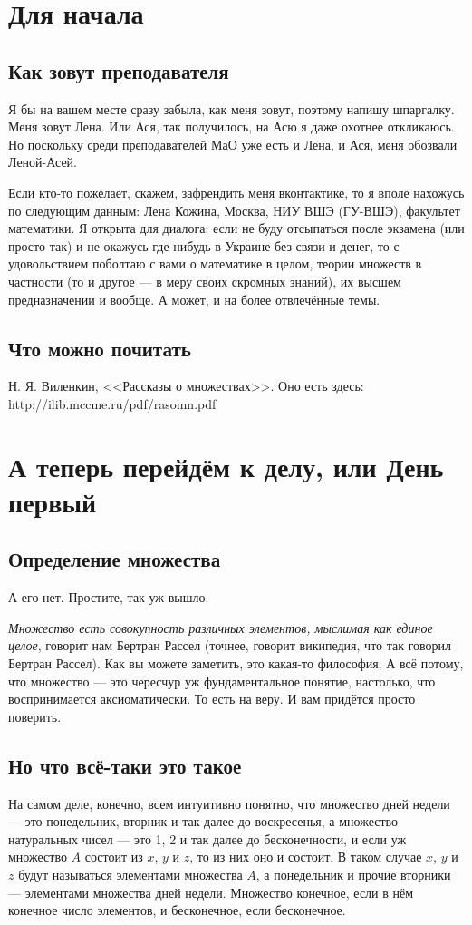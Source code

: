 \documentclass[12pt, onecolumn]{report}
\begin{document}
\chapter*{Для начала}
\section{Как зовут преподавателя}
Я бы на вашем месте сразу забыла, как меня зовут, поэтому напишу шпаргалку. Меня зовут Лена. Или Ася, так получилось, на Асю я даже охотнее откликаюсь. Но поскольку среди преподавателей МаО уже есть и Лена, и Ася, меня обозвали Леной-Асей.

Если кто-то пожелает, скажем, зафрендить меня вконтактике, то я вполе нахожусь по следующим данным: Лена Кожина, Москва, НИУ ВШЭ (ГУ-ВШЭ), факультет математики. Я открыта для диалога: если не буду отсыпаться после экзамена (или просто так) и не окажусь где-нибудь в Украине без связи и денег, то с удовольствием поболтаю с вами о математике в целом, теории множеств в частности (то и другое --- в меру своих скромных знаний), их высшем предназначении и вообще. А может, и на более отвлечённые темы. 
\section{Что можно почитать}
Н. Я. Виленкин, <<Рассказы о множествах>>. Оно есть здесь: \\ http://ilib.mccme.ru/pdf/rasomn.pdf
\chapter{А теперь перейдём к делу, или День первый}
\section{Определение множества}
А его нет. Простите, так уж вышло.

{\itshape Множество есть совокупность различных элементов, мыслимая как единое целое}, говорит нам Бертран Рассел  (точнее, говорит википедия, что так говорил Бертран Рассел). Как вы можете заметить, это какая-то философия. А всё потому, что множество --- это чересчур уж фундаментальное понятие, настолько, что воспринимается аксиоматически. То есть на веру. И вам придётся просто поверить.

\section{Но что всё-таки это такое}
На самом деле, конечно, всем интуитивно понятно, что множество дней недели --- это понедельник, вторник и так далее до воскресенья, а множество натуральных чисел --- это 1, 2 и так далее до бесконечности, и если уж множество $A$ состоит из $x$, $y$ и $z$, то из них оно и состоит. В таком случае $x$, $y$ и $z$ будут называться элементами множества $A$, а понедельник и прочие вторники --- элементами множества дней недели. Множество конечное, если в нём конечное число элементов, и бесконечное, если бесконечное.
\end{document}
